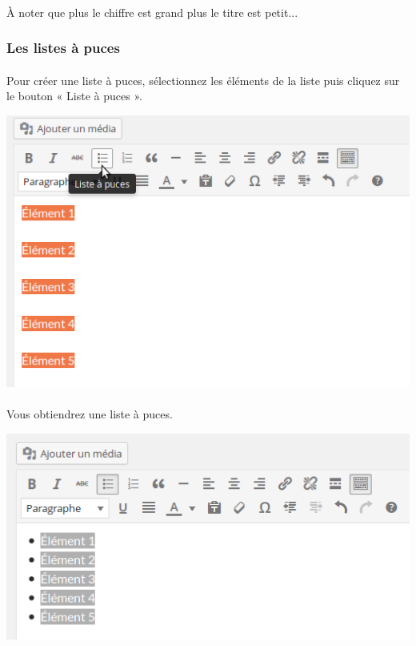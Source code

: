 \documentclass[10pt,a4paper]{article}
\begin{document}
\paragraph{}À noter que plus le chiffre est grand plus le titre est petit...
\subsubsection{Les listes à puces}
\paragraph{}Pour créer une liste à puces, sélectionnez les éléments de la liste puis cliquez sur le bouton « Liste à puces ».
\begin{center}
\includegraphics[scale=0.35]{img/0073.png}
\end{center}
\paragraph{}Vous obtiendrez une liste à puces.
\begin{center}
\includegraphics[scale=0.35]{img/0074.png}
\end{center}
\end{document}
